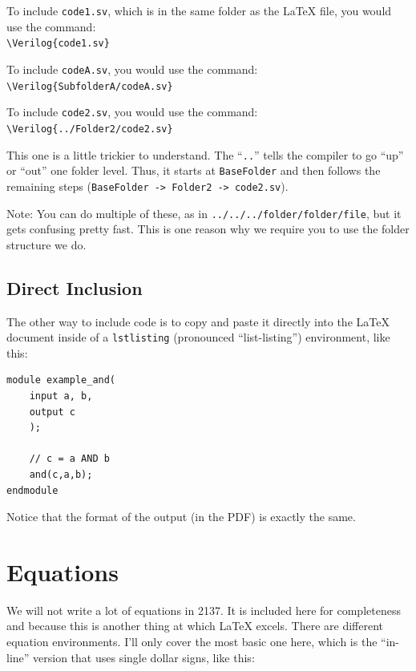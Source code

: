 \documentclass[11pt]{article}
\newcommand{\Verilog}[2][]{%
	
}
\begin{document}
To include \texttt{code1.sv}, which is in the same folder as the LaTeX file, you would use the command:\\
\hspace*{5ex}\verb|\Verilog{code1.sv}|

To include \texttt{codeA.sv}, you would use the command:\\
\hspace*{5ex}\verb|\Verilog{SubfolderA/codeA.sv}|

To include \texttt{code2.sv}, you would use the command:\\
\hspace*{5ex}\verb|\Verilog{../Folder2/code2.sv}|

This one is a little trickier to understand.  The ``\texttt{..}'' tells the compiler to go ``up'' or ``out'' one folder level.  Thus, it starts at \texttt{BaseFolder} and then follows the remaining steps (\texttt{BaseFolder -> Folder2 -> code2.sv}).  

Note: You can do multiple of these, as in \texttt{../../../folder/folder/file}, but it gets confusing pretty fast.  This is one reason why we require you to use the folder structure we do.

\subsection*{Direct Inclusion}

The other way to include code is to copy and paste it directly into the LaTeX document inside of a \texttt{lstlisting} (pronounced ``list-listing'') environment, like this:

\begin{lstlisting}[style=Verilog,
caption=Direct Verilog code example,
label=code:ex 
]
module example_and(
	input a, b,
	output c
	);
	
	// c = a AND b
	and(c,a,b);	
endmodule
\end{lstlisting}

Notice that the format of the output (in the PDF) is exactly the same.


\section*{Equations}
We will not write a lot of equations in 2137.  It is included here for completeness and because this is another thing at which LaTeX excels.  There are different equation environments.  I'll only cover the most basic one here, which is the ``in-line'' version that uses single dollar signs, like this:
\end{document}
